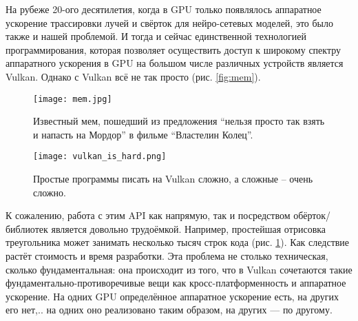 \documentclass[11pt,fleqn,english,russian]{report} %
\begin{document}
На рубеже 20-ого десятилетия, когда в GPU только появлялось аппаратное ускорение трассировки лучей и свёрток для нейро-сетевых моделей, это было также и нашей проблемой. И тогда и сейчас единственной технологией программирования, которая позволяет осуществить доступ к широкому спектру аппаратного ускорения в GPU на большом числе различных устройств является Vulkan. Однако с Vulkan всё не так просто (рис. \ref{fig:mem}). 


\begin{figure}[h]
\begin{minipage}{0.45\textwidth}
	\centering
	\texttt{[image: mem.jpg]}
	\caption{Известный мем, пошедший из предложения ``нельзя просто так взять и напасть на Мордор'' в фильме ``Властелин Колец''.}
	\label{fig:mem}
\end{minipage}
\hfill
\begin{minipage}{0.45\textwidth}
	\centering
	\texttt{[image: vulkan\_is\_hard.png]}
	\caption{Простые программы писать на Vulkan сложно, а сложные -- очень сложно.}
	\label{fig:vulkan_complexity}
\end{minipage}
\end{figure}


К сожалению, работа с этим API как напрямую, так и посредством обёрток/библиотек является довольно трудоёмкой. Например, простейшая отрисовка треугольника может занимать несколько тысяч строк кода (рис. \ref{fig:vulkan_complexity}). Как следствие растёт стоимость и время разработки. Эта проблема не столько техническая, сколько фундаментальная: она происходит из того, что в Vulkan сочетаются такие фундаментально-противоречивые вещи как кросс-платформенность и аппаратное ускорение. На одних GPU определённое аппаратное ускорение есть, на других его нет,.. на одних оно реализовано таким образом, на других --- по другому. 

\end{document}
